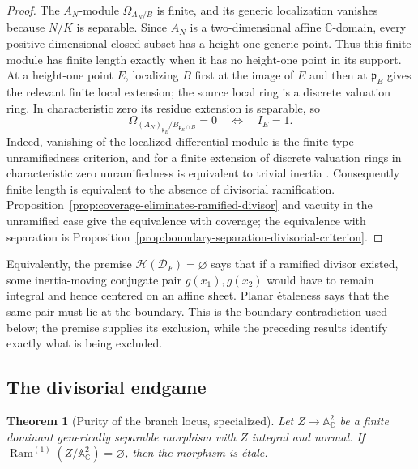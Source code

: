 \documentclass[11pt]{article}
\newtheorem{theorem}{Theorem}[section]
\theoremstyle{remark}
\theoremstyle{definition}
\DeclareMathOperator{\Ram}{Ram}
\newcommand{\A}{\mathbb A}
\newcommand{\C}{\mathbb C}
\begin{document}
\begin{proof}
The \(A_N\)-module \(\Omega_{A_N/B}\) is finite, and its generic
localization vanishes because \(N/K\) is separable.  Since \(A_N\) is a
two-dimensional affine \(\C\)-domain, every positive-dimensional closed
subset has a height-one generic point.  Thus this finite module has finite
length exactly when it has no height-one point in its support.  At a height-one
point \(E\), localizing \(B\) first at the image of \(E\) and then at
\(\mathfrak p_E\) gives the relevant finite local extension; the source
local ring is a discrete valuation ring.  In characteristic zero its
residue extension is separable, so
\[
  \Omega_{(A_N)_{\mathfrak p_E}/B_{\mathfrak p_E\cap B}}=0
  \quad\Longleftrightarrow\quad
  I_E=1.
\]
Indeed, vanishing of the localized differential module is the
finite-type unramifiedness criterion, and for a finite extension of
discrete valuation rings in characteristic zero unramifiedness is
equivalent to trivial inertia
\cite{StacksKaehlerDifferent,StacksDVRExtensions,StacksRamificationTheory}.
Consequently finite length is equivalent to the absence of divisorial
ramification.  Proposition~\ref{prop:coverage-eliminates-ramified-divisor}
and vacuity in the unramified case give the equivalence with coverage; the
equivalence with separation is
Proposition~\ref{prop:boundary-separation-divisorial-criterion}.
\end{proof}

Equivalently, the premise
\(\mathcal H(\mathcal D_F)=\varnothing\) says that if a ramified divisor
existed, some inertia-moving conjugate pair \(g(x_1),g(x_2)\) would have
to remain integral and hence centered on an affine sheet.  Planar
\'etaleness says that the same pair must lie at the boundary.  This is the
boundary contradiction used below; the premise supplies its exclusion,
while the preceding results identify exactly what is being excluded.

\subsection{The divisorial endgame}

\begin{theorem}[Purity of the branch locus, specialized]
\label{thm:branch-purity}
Let \(Z\to\A^2_{\C}\) be a finite dominant generically separable
morphism with \(Z\) integral and normal.  If
\(\Ram^{(1)}(Z/\A^2_{\C})=\varnothing\), then the morphism is \'etale.
\end{theorem}
\end{document}
